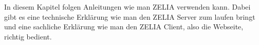 

In diesem Kapitel folgen Anleitungen wie man ZELIA verwenden kann. Dabei gibt es eine technische Erklärung wie man den ZELIA Server zum laufen bringt und eine sachliche Erklärung wie man den ZELIA Client, also die Webseite, richtig bedient.





